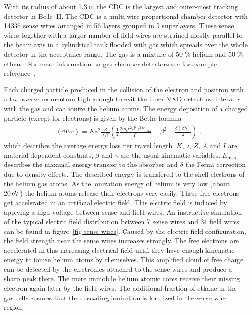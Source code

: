 With its radius of about $\unit[1.3]{m}$ the CDC is the largest and outer-most tracking detector in Belle~II. The CDC is a multi-wire proportional chamber detector with 14336 sense wires arranged in 56 layers grouped in 9 superlayers. These sense wires together with a larger number of field wires are strained mostly parallel to the beam axis in a cylindrical tank flooded with gas which spreads over the whole detector in the acceptance range. The gas is a mixture of 50 \% helium and 50 \% ethane. For more information on gas chamber detectors see for example reference~\cite{grupen}.

Each charged particle produced in the collision of the electron and positron with a transverse momentum high enough to exit the inner VXD detectors, interacts with the gas and can ionize the helium atoms. The energy deposition of a charged particle (except for electrons) is given by the Bethe formula~\cite{bethe}
\begin{align}
 - \left\langle \dd{E}{x} \right\rangle = K z^2 \frac{Z}{A \beta^2} \left( \frac 1 2 \frac{2 m_e c^2 \beta^2 \gamma^2 E_\text{max}}{I^2} - \beta^2 - \frac{\delta(\beta \gamma)}{2}  \right) \ , \label{form-bethe}
\end{align}
which describes the average energy loss per travel length. $K$, $z$, $Z$, $A$ and $I$ are material dependent constants, $\beta$ and $\gamma$ are the usual kinematic variables. $E_\text{max}$ describes the maximal energy transfer to the absorber and $\delta$ the Fermi correction due to density effects. The described energy is transfered to the shell electrons of the helium gas atoms. As the ionization energy of helium is very low (about $\unit[20]{eV}$) the helium atoms release their electrons very easily. These free electrons get accelerated in an artificial electric field. This electric field is induced by applying a high voltage between sense and field wires. An instructive simulation of the typical electric field distribution between 7 sense wires and 34 field wires can be found in figure~\ref{fig-sense-wires}. Caused by the electric field configuration, the field strength near the sense wires increases strongly. The free electrons are accelerated in this increasing electrical field until they have enough kinematic energy to ionize helium atoms by themselves. This amplified cloud of free charge can be detected by the electronics attached to the sense wires and produce a sharp peak there. The more immobile helium atomic cores receive their missing electron again later by the field wires. The additional fraction of ethane in the gas cells ensures that the cascading ionization is localized in the sense wire region.

